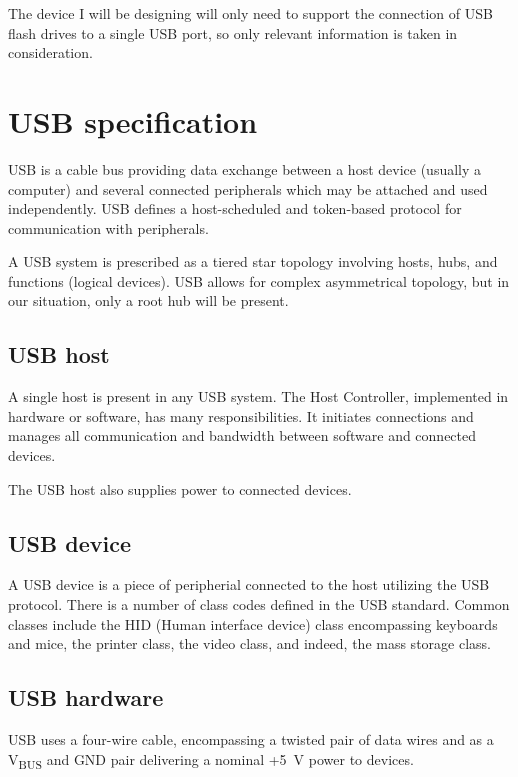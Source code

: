     The device I will be designing will only need to support the connection of USB flash drives to a single USB port, so only relevant information is taken in consideration.
    
    \section{USB specification}
        USB is a cable bus providing data exchange between a host device (usually a computer) and several connected peripherals which may be attached and used independently.  USB defines a host-scheduled and token-based protocol for communication with peripherals.
        
        A USB system is prescribed as a tiered star topology involving hosts, hubs, and functions (logical devices).  USB allows for complex asymmetrical topology, but in our situation, only a root hub will be present.
        
        \subsection{USB host}
            A single host is present in any USB system.  The Host Controller, implemented in hardware or software, has many responsibilities.  It initiates connections and manages all communication and bandwidth between software and connected devices.
            
            The USB host also supplies power to connected devices.
        
        \subsection{USB device}
            A USB device is a piece of peripherial connected to the host utilizing the USB protocol.  There is a number of class codes defined in the USB standard\cite{usb-class-codes}.  Common classes include the HID (Human interface device) class encompassing keyboards and mice, the printer class, the video class, and indeed, the mass storage class. 
        
        \subsection{USB hardware}
            USB uses a four-wire cable, encompassing a twisted pair of data wires and as a V\textsubscript{BUS} and GND pair delivering a nominal +5~V power to devices.
            
